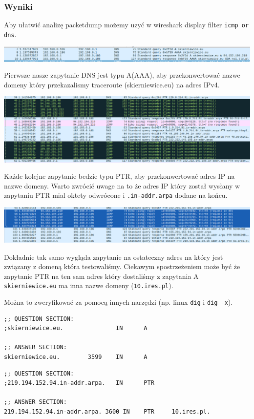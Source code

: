 \documentclass[11pt]{article}
\begin{document}
\subsubsection{Wyniki}
\label{sec:org59eb545}
Aby ułatwić analizę packetdump możemy uzyć w wireshark display filter \texttt{icmp or dns}.
\begin{center}
\includegraphics[width=.9\linewidth]{./part2/dnsA.png}
\end{center}
Pierwsze nasze zapytanie DNS jest typu A(AAA), aby przekonwertować nazwe domeny który przekazalismy traceroute (skierniewice.eu) na adres IPv4.
\begin{center}
\includegraphics[width=.9\linewidth]{./part2/dnsPTR1.png}
\end{center}
Każde kolejne zapytanie bedzie typu PTR, aby przekonwertować adres IP na nazwe domeny. Warto zwrócić uwage na to że adres IP który został wysłany w zapytaniu PTR mial oktety odwrócone i \texttt{.in-addr.arpa} dodane na końcu.
\begin{center}
\includegraphics[width=.9\linewidth]{./part2/dnsPTR2.png}
\end{center}
Dokładnie tak samo wygląda zapytanie na ostateczny adres na który jest związany z domeną która testowaliśmy.
Ciekawym spostrzeżeniem może być że zapytanie PTR na ten sam adres który dostaliśmy z zapytania A \texttt{skierniewice.eu} ma inna nazwe domeny (\texttt{10.ires.pl}).

Można to zweryfikować za pomocą innych narzędzi (np. linux \texttt{dig} i \texttt{dig -x}).
\begin{verbatim}
;; QUESTION SECTION:
;skierniewice.eu.               IN      A

;; ANSWER SECTION:
skierniewice.eu.        3599    IN      A      
\end{verbatim}
\begin{verbatim}
;; QUESTION SECTION:
;219.194.152.94.in-addr.arpa.   IN      PTR

;; ANSWER SECTION:
219.194.152.94.in-addr.arpa. 3600 IN    PTR     10.ires.pl.
\end{verbatim}
\end{document}
